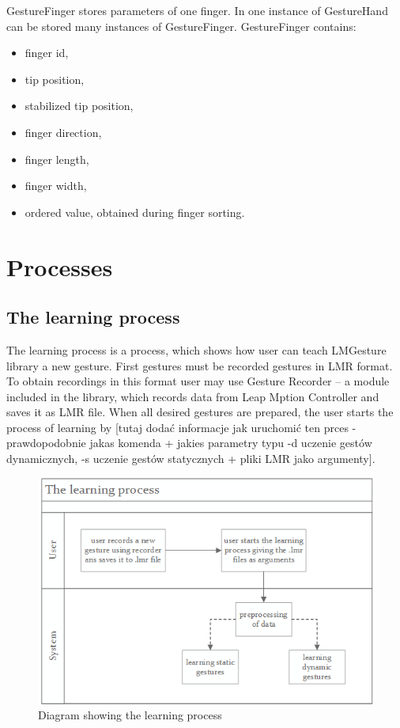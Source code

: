 GestureFinger stores parameters of one finger. In one instance of GestureHand can be stored many instances of GestureFinger. GestureFinger contains:
\begin{itemize}
\item finger id,
\item tip position,
\item stabilized tip position,
\item finger direction,
\item finger length,
\item finger width,
\item ordered value, obtained during finger sorting.
\end{itemize}

\section{Processes}

\subsection{The learning process}
The learning process is a process, which shows how user can teach LMGesture library a new gesture. First  gestures must be recorded gestures in LMR format. To obtain recordings in this format user may use Gesture Recorder --  a module included in the library, which records data from Leap Mption Controller and saves it as LMR file. When all desired gestures are prepared, the user starts the process of learning by {\color{red}[tutaj dodać informacje jak uruchomić ten prces - prawdopodobnie jakas komenda + jakies parametry typu -d uczenie gestów dynamicznych, -s uczenie gestów statycznych + pliki LMR jako argumenty]}. 

\begin{figure}[htb]
\centering
 \includegraphics[width=0.75\columnwidth]{figures/learningProcess.png}
 \caption{Diagram showing the learning process}
 \label{learningprocess}
\end{figure}

